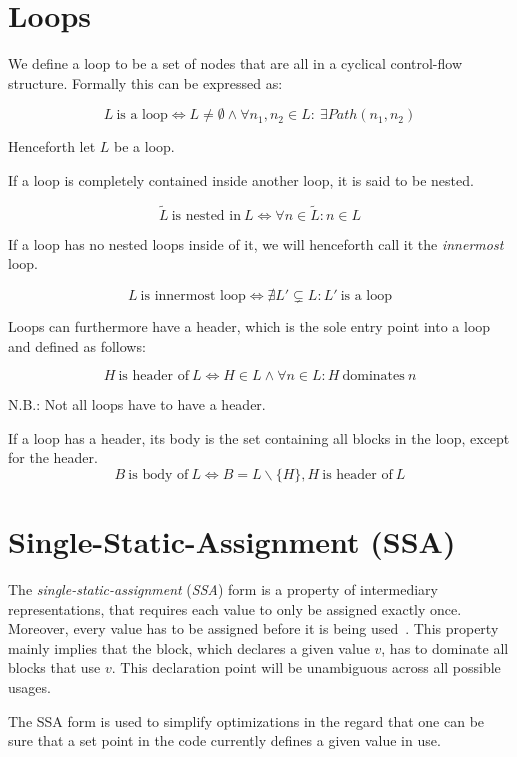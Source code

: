 
\section{Loops}\label{sec:basics:loops}

We define a loop to be a set of nodes that are all in a cyclical control-flow structure.
Formally this can be expressed as:

$$L~\text{is a loop} \Longleftrightarrow L \neq \emptyset \wedge \forall n_1, n_2 \in L:~\exists Path(n_1, n_2)$$

Henceforth let $L$ be a loop.

If a loop is completely contained inside another loop, it is said to be nested.

$$\tilde{L}~\text{is nested in}~L \Longleftrightarrow \forall n \in \tilde{L}: n \in L$$

If a loop has no nested loops inside of it, we will henceforth call it the \textit{innermost} loop.

$$L~\text{is innermost loop} \Longleftrightarrow \nexists L' \subsetneq L: L'~\text{is a loop}$$

Loops can furthermore have a header, which is the sole entry point into a loop~\cite{aebi18bachelorarbeit} and defined as follows:

$$H~\text{is header of}~L \Longleftrightarrow H \in L \wedge \forall n \in L: H~\text{dominates}~n$$

N.B.: Not all loops have to have a header.

If a loop has a header, its body is the set containing all blocks in the loop, except for the header.
$$B~\text{is body of}~L \Longleftrightarrow B = L \backslash \{H\}, H~\text{is header of}~L$$

\section{Single-Static-Assignment (SSA)}\label{sec:basics:ssa}

The \textit{single-static-assignment} (\textit{SSA}) form is a property of intermediary representations, that requires each value to only be assigned exactly once.
Moreover, every value has to be assigned before it is being used~\cite{cytron91}.
This property mainly implies that the block, which declares a given value $v$, has to dominate all blocks that use $v$.
This declaration point will be unambiguous across all possible usages.

The SSA form is used to simplify optimizations in the regard that one can be sure that a set point in the code currently defines a given value in use.

